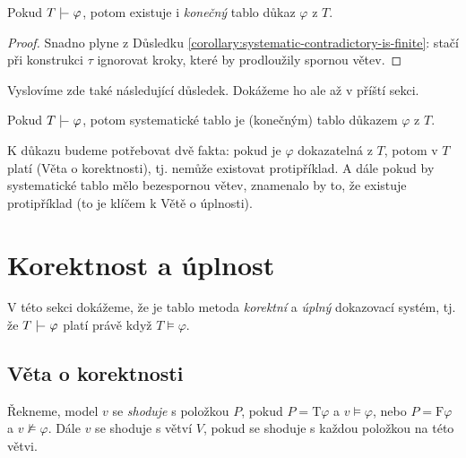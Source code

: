 \begin{corollary}\label{corollary:finiteness-of-proofs}
    Pokud $T\proves\varphi$, potom existuje i \emph{konečný} tablo důkaz $\varphi$ z $T$.
\end{corollary}
\begin{proof}
Snadno plyne z Důsledku \ref{corollary:systematic-contradictory-is-finite}: stačí při konstrukci $\tau$ ignorovat kroky, které by prodloužily spornou větev.
\end{proof}

Vyslovíme zde také následující důsledek. Dokážeme ho ale až v příští sekci.

\begin{corollary}\label{corollary:systematicity-of-proofs}
    Pokud $T\proves\varphi$, potom systematické tablo je (konečným) tablo důkazem $\varphi$ z $T$.
\end{corollary}

K důkazu budeme potřebovat dvě fakta: pokud je $\varphi$ dokazatelná z $T$, potom v $T$ platí (Věta o korektnosti), tj. nemůže existovat protipříklad. A dále pokud by systematické tablo mělo bezespornou větev, znamenalo by to, že existuje protipříklad (to je klíčem k Větě o úplnosti).


\section{Korektnost a úplnost}

V této sekci dokážeme, že je tablo metoda \emph{korektní} a \emph{úplný} dokazovací systém, tj. že $T\proves\varphi$ platí právě když $T\models\varphi$.

\subsection{Věta o korektnosti}

Řekneme, model $v$ se \emph{shoduje} s položkou $P$, pokud
$P=\mathrm{T}\varphi$ a $v\models\varphi$, nebo $P=\mathrm{F}\varphi$ a $v\not\models\varphi$. Dále $v$ se shoduje s větví $V$, pokud se shoduje s každou položkou na této větvi.

